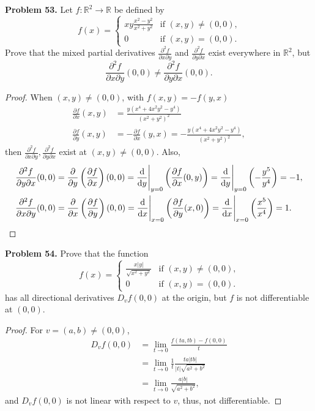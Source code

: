 \documentclass[12pt,leqno]{amsart}
\theoremstyle{definition}
\begin{document}
\noindent
{\bf Problem 53.}
Let $f:\mathbb{R}^2\to\mathbb{R}$ be defined by
$$
f(x)=
\begin{cases}
xy\frac{x^2-y^2}{x^2+y^2} & \text{if $(x,y)\neq (0,0)$,}\\
0                           & \text{if $(x,y)=(0,0)$.}
\end{cases}
$$
Prove that the mixed partial derivatives
$\frac{\partial^2 f}{\partial x\partial y}$ and
$\frac{\partial^2 f}{\partial y\partial x}$
exist everywhere in $\mathbb{R}^2$, but
$$
\frac{\partial^2 f}{\partial x\partial y}(0,0)\neq
\frac{\partial^2 f}{\partial y\partial x}(0,0).
$$
\begin{proof}
When $(x,y) \neq (0,0)$, with $f(x,y) = - f(y,x)$
\begin{align*}
    \frac{\partial f}{\partial x}(x,y) & = \frac{y(x^4 + 4x^2y^2 - y^4)}{\left(x^2 + y^2\right)^2}\\
    \frac{\partial f}{\partial y}(x,y) & = - \frac{\partial f}{\partial x}(y,x) = - \frac{y(x^4 + 4x^2y^2 - y^4)}{\left(x^2 + y^2\right)^2},
\end{align*}
then $\frac{\partial^2 f}{\partial x\partial y}, \frac{\partial^2 f}{\partial y\partial x}$ exist at $(x,y) \neq (0,0)$. Also, 
\begin{align*}
    \frac{\partial^2 f}{\partial y \partial x}(0,0) & = \frac{\partial}{\partial y}\left(\frac{\partial f}{\partial x}\right)(0,0) = \dv{}{y}\Bigg|_{y=0} \left(\frac{\partial f}{\partial x}(0,y)\right) = \dv{}{y}\Bigg|_{y=0} \left(- \frac{y^5}{y^4}\right) = -1, \\
    \frac{\partial^2 f}{\partial x\partial y}(0,0) & = \frac{\partial}{\partial x}\left(\frac{\partial f}{\partial y}\right)(0,0) = \dv{}{x}\Bigg|_{x=0} \left(\frac{\partial f}{\partial y}(x,0)\right) = \dv{}{x}\Bigg|_{x=0} \left(\frac{x^5}{x^4}\right) = 1.
\end{align*}
\end{proof}

\medskip

\noindent
{\bf Problem 54.}
Prove that the function
$$
f(x)=
\begin{cases}
\frac{x|y|}{\sqrt{x^2+y^2}} & \text{if $(x,y)\neq (0,0)$,}\\
0                           & \text{if $(x,y)=(0,0)$.}
\end{cases}
$$
has all directional derivatives $D_vf(0,0)$ at the origin, but $f$ is not differentiable at $(0,0)$.
\begin{proof}
For $v = (a,b) \neq (0,0)$, 
\begin{align*}
    D_vf(0,0) & = \lim_{t\to 0} \frac{f(ta,tb) - f(0,0)}{t} \\ 
    & = \lim_{t\to 0} \frac{1}{t} \frac{ta|tb|}{|t|\sqrt{a^2+b^2}} \\
    & = \lim_{t\to 0} \frac{a|b|}{\sqrt{a^2+b^2}},
\end{align*}
and $D_vf(0,0)$ is not linear with respect to $v$, thus, not differentiable.
\end{proof}
\end{document}
